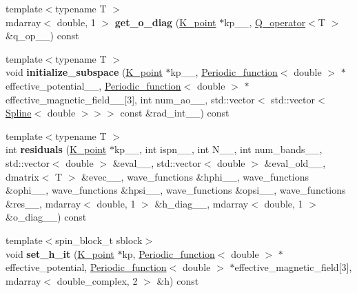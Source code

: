 \begin{DoxyCompactItemize}
\item 
\hypertarget{classsirius_1_1_band_aad43c84b16d916b90d247a97004343bf}{}{\footnotesize template$<$typename T $>$ }\\mdarray$<$ double, 1 $>$ {\bfseries get\+\_\+o\+\_\+diag} (\hyperlink{classsirius_1_1_k__point}{K\+\_\+point} $\ast$kp\+\_\+\+\_\+, \hyperlink{classsirius_1_1_q__operator}{Q\+\_\+operator}$<$T $>$ \&q\+\_\+op\+\_\+\+\_\+) const \label{classsirius_1_1_band_aad43c84b16d916b90d247a97004343bf}

\item 
\hypertarget{classsirius_1_1_band_ac0d14aee6cec32436ab9c5a7678f2e1e}{}{\footnotesize template$<$typename T $>$ }\\void {\bfseries initialize\+\_\+subspace} (\hyperlink{classsirius_1_1_k__point}{K\+\_\+point} $\ast$kp\+\_\+\+\_\+, \hyperlink{classsirius_1_1_periodic__function}{Periodic\+\_\+function}$<$ double $>$ $\ast$effective\+\_\+potential\+\_\+\+\_\+, \hyperlink{classsirius_1_1_periodic__function}{Periodic\+\_\+function}$<$ double $>$ $\ast$effective\+\_\+magnetic\+\_\+field\+\_\+\+\_\+\mbox{[}3\mbox{]}, int num\+\_\+ao\+\_\+\+\_\+, std\+::vector$<$ std\+::vector$<$ \hyperlink{classsirius_1_1_spline}{Spline}$<$ double $>$$>$$>$ const \&rad\+\_\+int\+\_\+\+\_\+) const \label{classsirius_1_1_band_ac0d14aee6cec32436ab9c5a7678f2e1e}

\item 
\hypertarget{classsirius_1_1_band_a67420feea6fe0b7ddfa9bef5652a6d6c}{}{\footnotesize template$<$typename T $>$ }\\int {\bfseries residuals} (\hyperlink{classsirius_1_1_k__point}{K\+\_\+point} $\ast$kp\+\_\+\+\_\+, int ispn\+\_\+\+\_\+, int N\+\_\+\+\_\+, int num\+\_\+bands\+\_\+\+\_\+, std\+::vector$<$ double $>$ \&eval\+\_\+\+\_\+, std\+::vector$<$ double $>$ \&eval\+\_\+old\+\_\+\+\_\+, dmatrix$<$ T $>$ \&evec\+\_\+\+\_\+, wave\+\_\+functions \&hphi\+\_\+\+\_\+, wave\+\_\+functions \&ophi\+\_\+\+\_\+, wave\+\_\+functions \&hpsi\+\_\+\+\_\+, wave\+\_\+functions \&opsi\+\_\+\+\_\+, wave\+\_\+functions \&res\+\_\+\+\_\+, mdarray$<$ double, 1 $>$ \&h\+\_\+diag\+\_\+\+\_\+, mdarray$<$ double, 1 $>$ \&o\+\_\+diag\+\_\+\+\_\+) const \label{classsirius_1_1_band_a67420feea6fe0b7ddfa9bef5652a6d6c}

\item 
\hypertarget{classsirius_1_1_band_add04335abe6ac70f46aa6c58842bb6de}{}{\footnotesize template$<$spin\+\_\+block\+\_\+t sblock$>$ }\\void {\bfseries set\+\_\+h\+\_\+it} (\hyperlink{classsirius_1_1_k__point}{K\+\_\+point} $\ast$kp, \hyperlink{classsirius_1_1_periodic__function}{Periodic\+\_\+function}$<$ double $>$ $\ast$effective\+\_\+potential, \hyperlink{classsirius_1_1_periodic__function}{Periodic\+\_\+function}$<$ double $>$ $\ast$effective\+\_\+magnetic\+\_\+field\mbox{[}3\mbox{]}, mdarray$<$ double\+\_\+complex, 2 $>$ \&h) const \label{classsirius_1_1_band_add04335abe6ac70f46aa6c58842bb6de}


\end{DoxyCompactItemize}
